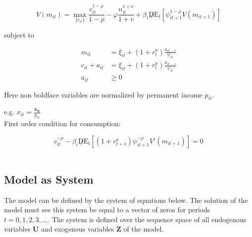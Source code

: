 \documentclass[titlepage]{\econtex}\providecommand{\texname}{BufferStockTheory}
\begin{document}
$$ V(m_{it}) = \max_{\{c_{it}\}} {  \frac{c_{i t}^{1-\rho}}{1 -\rho} - \varphi \frac{n_{it}^{1+v}}{1+v} + \beta_{i}\not D \mathrm{E}_{t}[\psi_{it+1}^{1-\rho} V(m_{it+1})]}$$

 subject to 
 
 \begin{align*}
m_{i t} &=  \xi_{it}  + (1+r^{a}_{t}) \frac{a_{i t-1}}{\psi_{it}} \\
 c_{i t}  + a_{i t} &= \xi_{it}  + (1+r^{a}_{t}) \frac{a_{i t-1}}{\psi_{it}} \\
 a_{it} &\geq 0 
 \end{align*}
 
 Here non boldface variables are normalized by permanent income $\mathit{p_{it}}$. 

e.g. $x_{it} = \frac{\mathbf{x_{it}}}{\pmb{\mathrm{p}}_{it}}$ \\

First order condition for consumption:

$$c_{it}^{-\rho} -  \beta_{i} \not D \mathrm{E}_{t}\left[ (1+r^{a}_{t+1})  \psi_{it+1}^{-\rho} V'(m_{it+1})\right] = 0$$ \\ 












\hypertarget{Model as System}{}
\subsection{Model as System}

The model can be defined by the system of equations below. The solution of the model must see this system be equal to a vector of zeros for periods $t =0, 1, 2, 3, ...$. The system is defined over the sequence space of all endogenous variables $\mathbf{U}$  and exogenous variables $\mathbf{Z}$ of the model.
\end{document}
